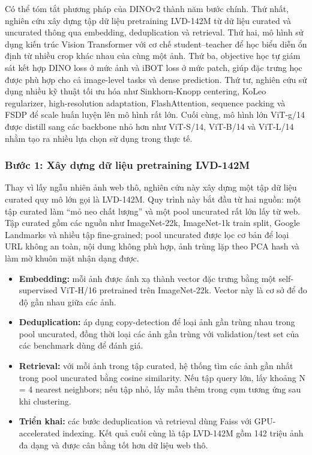 Có thể tóm tắt phương pháp của DINOv2 thành năm bước chính. Thứ nhất, nghiên cứu xây dựng tập dữ liệu pretraining LVD-142M từ dữ liệu curated và uncurated thông qua embedding, deduplication và retrieval. Thứ hai, mô hình sử dụng kiến trúc Vision Transformer với cơ chế student–teacher để học biểu diễn ổn định từ nhiều crop khác nhau của cùng một ảnh. Thứ ba, objective học tự giám sát kết hợp DINO loss ở mức ảnh và iBOT loss ở mức patch, giúp đặc trưng học được phù hợp cho cả image-level tasks và dense prediction. Thứ tư, nghiên cứu sử dụng nhiều kỹ thuật tối ưu hóa như Sinkhorn-Knopp centering, KoLeo regularizer, high-resolution adaptation, FlashAttention, sequence packing và FSDP để scale huấn luyện lên mô hình rất lớn. Cuối cùng, mô hình lớn ViT-g/14 được distill sang các backbone nhỏ hơn như ViT-S/14, ViT-B/14 và ViT-L/14 nhằm tạo ra nhiều lựa chọn sử dụng trong thực tế.

\subsubsection*{Bước 1: Xây dựng dữ liệu pretraining LVD-142M}
Thay vì lấy ngẫu nhiên ảnh web thô, nghiên cứu này xây dựng một tập dữ liệu curated quy mô lớn gọi là LVD-142M. Quy trình này bắt đầu từ hai nguồn: một tập curated làm “mỏ neo chất lượng” và một pool uncurated rất lớn lấy từ web. Tập curated gồm các nguồn như ImageNet-22k, ImageNet-1k train split, Google Landmarks và nhiều tập fine-grained; pool uncurated được lọc cơ bản để loại URL không an toàn, nội dung không phù hợp, ảnh trùng lặp theo PCA hash và làm mờ khuôn mặt nhận dạng được.
\begin{itemize}
    \item \textbf{Embedding:} mỗi ảnh được ánh xạ thành vector đặc trưng bằng một self-supervised ViT-H/16 pretrained trên ImageNet-22k. Vector này là cơ sở để đo độ gần nhau giữa các ảnh.
    \item \textbf{Deduplication:} áp dụng copy-detection để loại ảnh gần trùng nhau trong pool uncurated, đồng thời loại các ảnh gần trùng với validation/test set của các benchmark dùng để đánh giá.
    \item \textbf{Retrieval:} với mỗi ảnh trong tập curated, hệ thống tìm các ảnh gần nhất trong pool uncurated bằng cosine similarity. Nếu tập query lớn, lấy khoảng N = 4 nearest neighbors; nếu tập nhỏ, lấy mẫu thêm trong cụm tương ứng sau khi clustering.
    \item \textbf{Triển khai:} các bước deduplication và retrieval dùng Faiss với GPU-accelerated indexing. Kết quả cuối cùng là tập LVD-142M gồm 142 triệu ảnh đa dạng và được cân bằng tốt hơn dữ liệu web thô.
\end{itemize}

